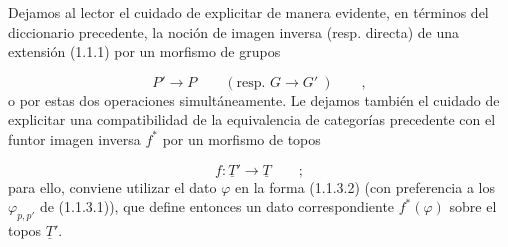 Dejamos al lector el cuidado de explicitar de manera evidente, en
términos del diccionario precedente, la noción de imagen inversa (resp.
directa) de una extensión (1.1.1) por un morfismo de grupos

\begin{equation*}
P' \longrightarrow P \qquad (\text{resp. } G \longrightarrow G'\ ) \qquad ,
\end{equation*}
o por estas dos operaciones simultáneamente. Le dejamos también el
cuidado de explicitar una compatibilidad de la equivalencia de
categorías precedente con el funtor imagen inversa $f^*$ por un morfismo de
topos

\begin{equation*}
f : \underline{T}' \longrightarrow \underline{T} \qquad ;
\end{equation*}
para ello, conviene utilizar el dato $\varphi$ en la forma (1.1.3.2)
(con preferencia a los $\varphi_{p,p'}$ de (1.1.3.1)), que define
entonces un dato correspondiente $f^*(\varphi)$ sobre el topos
$\underline{T}'$.
